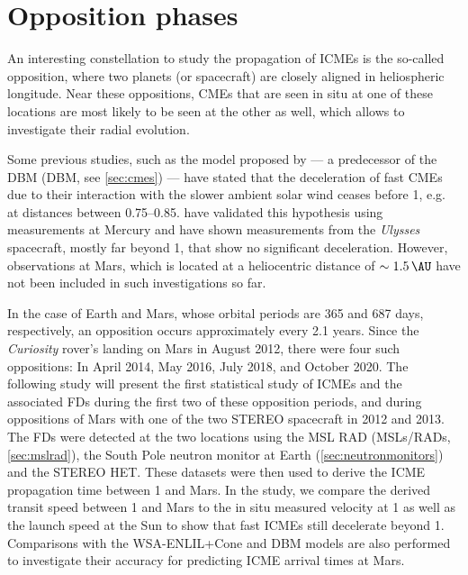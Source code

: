 \section{Opposition phases}
An interesting constellation to study the propagation of \acp{ICME} is the so-called opposition, where two planets (or spacecraft) are closely aligned in heliospheric longitude. Near these oppositions, CMEs that are seen in situ at one of these locations are most likely to be seen at the other as well, which allows to investigate their radial evolution.

Some previous studies, such as the model proposed by \citet{Gopalswamy-2001} --- a predecessor of the \acl{DBM} (\acs{DBM}, see \autoref{sec:cmes}) --- have stated that the deceleration of fast \acp{CME} due to their interaction with the slower ambient solar wind ceases before \SI{1}{\AU}, e.g. at distances between \SIrange[range-phrase={\,and\,}]{0.75}{0.85}{\AU}. \citet{Winslow-2015} have validated this hypothesis using measurements at Mercury and \citet{Wang-2005} have shown measurements from the \textit{Ulysses} spacecraft, mostly far beyond \SI{1}{\AU}, that show no significant deceleration. However, observations at Mars, which  is located at a heliocentric distance of $\sim\SI{1.5}{\AU}$ have not been included in such investigations so far.

In the case of Earth and Mars, whose orbital periods are 365 and 687 days, respectively, an opposition occurs approximately every 2.1 years. Since the \textit{Curiosity} rover's landing on Mars in August 2012, there were four such oppositions: In April 2014, May 2016, July 2018, and October 2020. The following study will present the first statistical study of \acp{ICME} and the associated \acp{FD} during the first two of these opposition periods, and during oppositions of Mars with one of the two \ac{STEREO} spacecraft in 2012 and 2013. The \acp{FD} were detected at the two locations using the \acl{MSL} \acl{RAD} (\acp{MSL}/\acp{RAD}, \autoref{sec:mslrad}), the South Pole neutron monitor at Earth (\autoref{sec:neutronmonitors}) and the \ac{STEREO} \ac{HET}. These datasets were then used to derive the \ac{ICME} propagation time between \SI{1}{\AU} and Mars. In the study, we compare the derived transit speed between \SI{1}{\AU} and Mars to the in situ measured velocity at \SI{1}{\AU} as well as the launch speed at the Sun to show that fast \acp{ICME} still decelerate beyond \SI{1}{\AU}. Comparisons with the WSA-ENLIL+Cone and \ac{DBM} models are also performed to investigate their accuracy for predicting \ac{ICME} arrival times at Mars.

